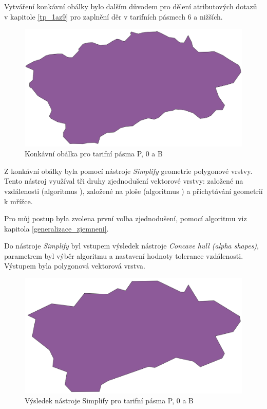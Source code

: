 Vytváření konkávní obálky bylo dalším důvodem pro dělení atributových dotazů v kapitole \ref{tp_1az9} pro 
zaplnění děr v tarifních pásmech 6 a nižších.  

\begin{figure}[H] \centering
    \includegraphics[width=400pt]{./pictures/concaveHull-P0B.png}
    \caption[Konkávní obálka]{Konkávní obálka pro tarifní pásma P, 0 a B}
	\label{fig:concaveHull-P0B}              
\end{figure} 

Z konkávní obálky byla pomocí nástroje \textit{Simplify}  geometrie polygonové vrstvy. Tento nástroj
využíval tři druhy zjednodušení vektorové vrstvy: založené na vzdálenosti (algoritmus ),
založené na ploše (algoritmus ) a přichytávání geometrií k mřížce.

Pro můj postup byla zvolena první volba zjednodušení, pomocí algoritmu  viz kapitola \ref{generalizace_zjemneni}.


Do nástroje \textit{Simplify} byl vstupem výsledek nástroje \textit{Concave hull (alpha shapes)}, parametrem byl výběr algoritmu 
a nastavení hodnoty tolerance vzdálenosti. Výstupem byla polygonová vektorová vrstva.

\begin{figure}[H] \centering
    \includegraphics[width=400pt]{./pictures/simplify-P0B.png}
    \caption[Výsledek nástroje Simplify pro tarifní pásma P, 0 a B]{Výsledek nástroje Simplify pro tarifní pásma P, 0 a B}
	\label{fig:simplify-P0B}                                
\end{figure}

